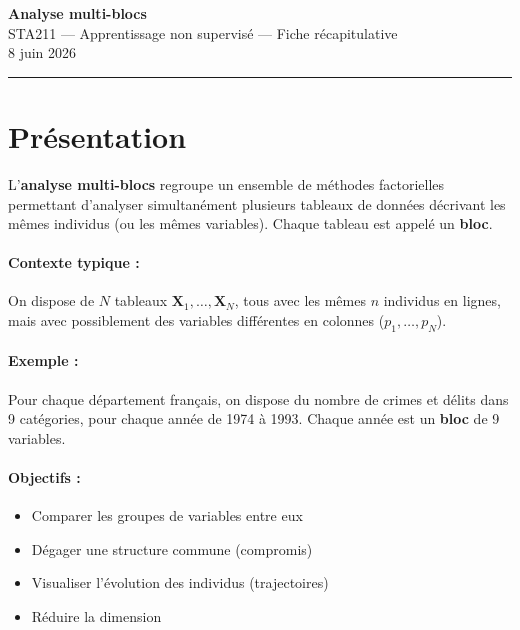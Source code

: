 \documentclass[a4paper,11pt]{article}
\begin{document}
\begin{center}
{\LARGE\textbf{Analyse multi-blocs}} \\
\vspace{0.3cm}
STA211 — Apprentissage non supervisé — Fiche récapitulative \\
8 juin 2026
\end{center}

\vspace{0.3cm}
\rule{\textwidth}{0.4pt}
\vspace{0.3cm}

\tableofcontents
\newpage

\section{Présentation}

L'\textbf{analyse multi-blocs} regroupe un ensemble de méthodes factorielles permettant d'analyser simultanément plusieurs tableaux de données décrivant les mêmes individus (ou les mêmes variables). Chaque tableau est appelé un \textbf{bloc}.

\paragraph{Contexte typique :}
On dispose de $N$ tableaux $\mathbf{X}_1, \ldots, \mathbf{X}_N$, tous avec les mêmes $n$ individus en lignes, mais avec possiblement des variables différentes en colonnes ($p_1, \ldots, p_N$).

\paragraph{Exemple :}
Pour chaque département français, on dispose du nombre de crimes et délits dans 9 catégories, pour chaque année de 1974 à 1993. Chaque année est un \textbf{bloc} de 9 variables.

\paragraph{Objectifs :}
\begin{itemize}
    \item Comparer les groupes de variables entre eux
    \item Dégager une structure commune (compromis)
    \item Visualiser l'évolution des individus (trajectoires)
    \item Réduire la dimension
\end{itemize}
\end{document}
